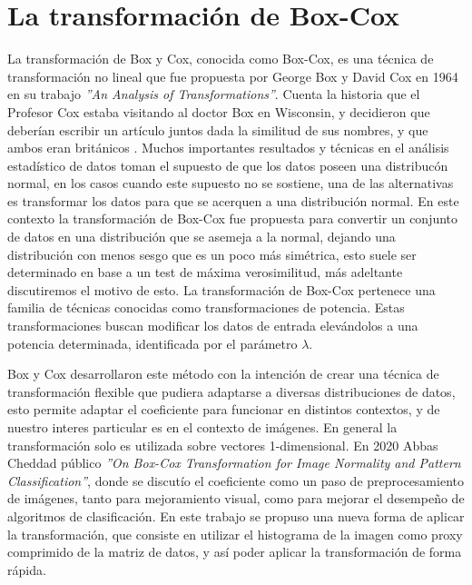 \chapter{La transformaci\'on de Box-Cox}\label{chap4}

    La transformaci\'on de Box y Cox, conocida como Box-Cox, es una t\'ecnica de transformaci\'on no lineal que fue propuesta por George Box y David Cox en 1964 en su trabajo \textit{''An Analysis of Transformations''}\cite{boxcox64}. Cuenta la historia que el Profesor Cox estaba visitando al doctor Box en Wisconsin, y decidieron que deberían escribir un artículo juntos dada la similitud de sus nombres, y que ambos eran británicos \cite{lane2003introduction}. 
    Muchos importantes resultados y t\'ecnicas en el an\'alisis estad\'istico de datos toman el supuesto de que los datos poseen una distribuc\'on normal, en los casos cuando este supuesto no se sostiene, una de las alternativas es transformar los datos para que se acerquen a una distribuci\'on normal. En este contexto la transformaci\'on de Box-Cox fue propuesta para convertir un conjunto de datos en una distribuci\'on que se asemeja a la normal, dejando una distribuci\'on con menos sesgo que es un poco m\'as sim\'etrica, esto suele ser determinado en base a un test de m\'axima verosimilitud, m\'as adeltante discutiremos el motivo de esto. La transformaci\'on de Box-Cox pertenece una familia de t\'ecnicas conocidas como transformaciones de potencia. Estas transformaciones buscan modificar los datos de entrada elev\'andolos a una potencia determinada, identificada por el par\'ametro $\lambda$.
    
    Box y Cox desarrollaron este m\'etodo con la intenci\'on de crear una t\'ecnica de transformaci\'on flexible que pudiera adaptarse a diversas distribuciones de datos, esto permite adaptar el coeficiente para funcionar en distintos contextos, y de nuestro interes particular es en el contexto de im\'agenes. En general la transformaci\'on solo es utilizada sobre vectores 1-dimensional. En 2020 Abbas Cheddad p\'ublico \textit{''On Box-Cox Transformation for Image Normality and Pattern Classification''}\cite{boxcoximg}, donde se discut\'io el coeficiente como un paso de preprocesamiento de im\'agenes, tanto para mejoramiento visual, como para mejorar el desempe\~no de algoritmos de clasificaci\'on. En este trabajo se propuso una nueva forma de aplicar la transformaci\'on, que consiste en utilizar el histograma de la imagen como proxy comprimido de la matriz de datos, y as\'i poder aplicar la transformaci\'on de forma r\'apida.
    
